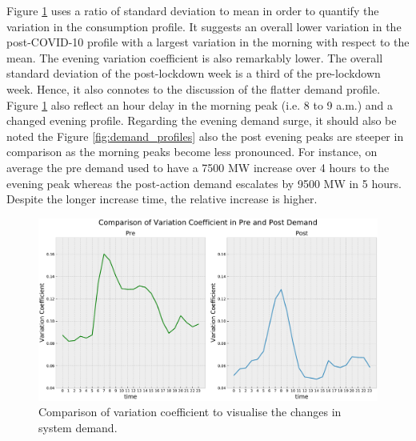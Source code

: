 \documentclass[energies,article,submit,moreauthors,pdftex]{Definitions/mdpi}
\begin{document}
Figure \ref{fig: var_dem} uses a ratio of standard deviation to mean in order to quantify the variation in the consumption profile. It suggests an overall lower variation in the post-COVID-10 profile with a largest variation in the morning with respect to the mean. The evening variation coefficient is also remarkably lower. The overall standard deviation of the post-lockdown week is a third of the pre-lockdown week. Hence, it also connotes to the discussion of the flatter demand profile. Figure \ref{fig: var_dem} also reflect an hour delay in the morning peak (i.e. 8 to 9 a.m.) and a changed evening profile. Regarding the evening demand surge, it should also be noted the Figure \ref{fig:demand_profiles} also the post evening peaks are steeper in comparison as the morning peaks become less pronounced. For instance, on average the pre demand used to have a 7500 MW increase over 4 hours to the evening peak whereas the post-action demand escalates by 9500 MW in 5 hours. Despite the longer increase time, the relative increase is higher.


\begin{figure}[H]
\centering
\hspace{-25pt}\includegraphics[width=14 cm]{Graphics/VarCoeff_comp.pdf}
\caption{Comparison of variation coefficient to visualise the changes in system demand.}\label{fig: var_dem}
\end{figure}  
\end{document}
